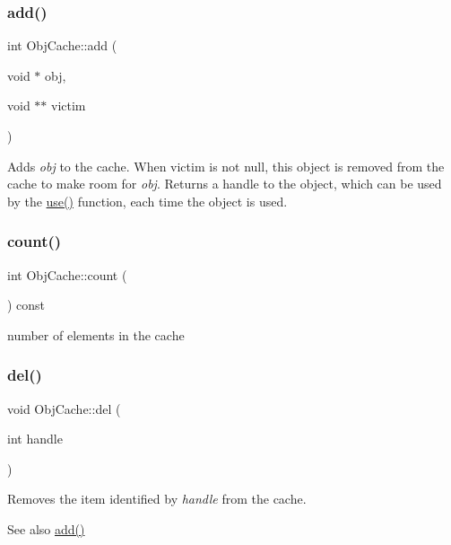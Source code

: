 \subsubsection{\texorpdfstring{add()}{add()}}
{\footnotesize\ttfamily int Obj\+Cache\+::add (\begin{DoxyParamCaption}\item[{void $\ast$}]{obj,  }\item[{void $\ast$$\ast$}]{victim }\end{DoxyParamCaption})}

Adds {\itshape obj} to the cache. When victim is not null, this object is removed from the cache to make room for {\itshape obj}. Returns a handle to the object, which can be used by the \mbox{\hyperlink{class_obj_cache_ac4d9eb810e8f6ca2fbd4cf058ff3fe0e}{use()}} function, each time the object is used. \mbox{\label{class_obj_cache_a134d58930129019d44886eda2bdec41d}} 
\subsubsection{\texorpdfstring{count()}{count()}}
{\footnotesize\ttfamily int Obj\+Cache\+::count (\begin{DoxyParamCaption}{ }\end{DoxyParamCaption}) const\hspace{0.3cm}{\ttfamily [inline]}}

number of elements in the cache \mbox{\label{class_obj_cache_a3ac1ae674ea8ff27e436c788f851d303}} 
\subsubsection{\texorpdfstring{del()}{del()}}
{\footnotesize\ttfamily void Obj\+Cache\+::del (\begin{DoxyParamCaption}\item[{int}]{handle }\end{DoxyParamCaption})}

Removes the item identified by {\itshape handle} from the cache. \begin{DoxySeeAlso}{See also}
\mbox{\hyperlink{class_obj_cache_affd025326493c40ac4e7f5b4c0c3ad9b}{add()}} 
\end{DoxySeeAlso}
\mbox{\label{class_obj_cache_aeea7452ce80751d3f8e76038dc44decc}} 
